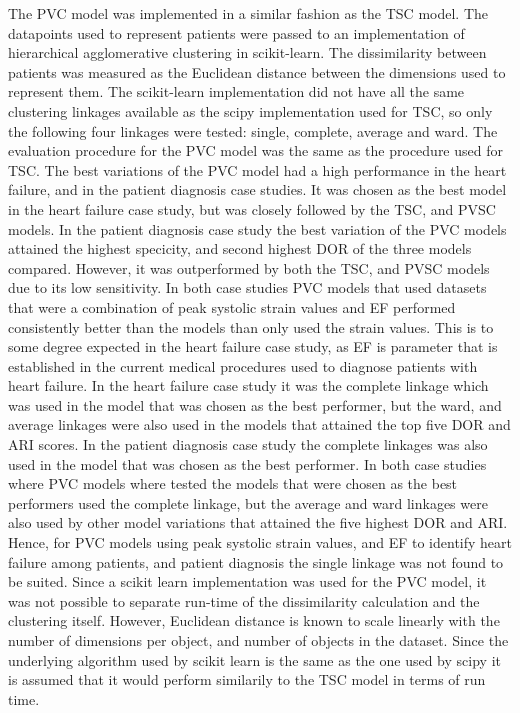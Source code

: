 The PVC model was implemented in a similar fashion as the TSC model.
The datapoints used to represent patients were passed to an implementation of hierarchical agglomerative clustering in scikit-learn.
The dissimilarity between patients was measured as the Euclidean distance between the dimensions used to represent them.
The scikit-learn implementation did not have all the same clustering linkages available as the scipy implementation used for TSC, so only the following four linkages were tested: single, complete, average and ward.
The evaluation procedure for the PVC model was the same as the procedure used for TSC.
The best variations of the PVC model had a high performance in the heart failure, and in the patient diagnosis case studies. 
It was chosen as the best model in the heart failure case study, but was closely followed by the TSC, and PVSC models.
In the patient diagnosis case study the best variation of the PVC models attained the highest specicity, and second highest DOR of the three models compared. 
However, it was outperformed by both the TSC, and PVSC models due to its low sensitivity.
In both case studies PVC models that used datasets that were a combination of peak systolic strain values and EF performed consistently better than the models than only used the strain values. 
This is to some degree expected in the heart failure case study, as EF is parameter that is established in the current medical procedures used to diagnose patients with heart failure.
In the heart failure case study it was the complete linkage which was used in the model that was chosen as the best performer, but the ward, and average linkages were also used in the models that attained the top five DOR and ARI scores.
In the patient diagnosis case study the complete linkages was also used in the model that was chosen as the best performer.
In both case studies where PVC models where tested the models that were chosen as the best performers used the complete linkage, but the average and ward linkages were also used by other model variations that attained the five highest DOR and ARI.
Hence, for PVC models using peak systolic strain values, and EF to identify heart failure among patients, and patient diagnosis the single linkage was not found to be suited.
Since a scikit learn implementation was used for the PVC model, it was not possible to separate run-time of the dissimilarity calculation and the clustering itself.  
However, Euclidean distance is known to scale linearly with the number of dimensions per object, and number of objects in the dataset.
Since the underlying algorithm used by scikit learn is the same as the one used by scipy it is assumed that it would perform similarily to the TSC model in terms of run time.

